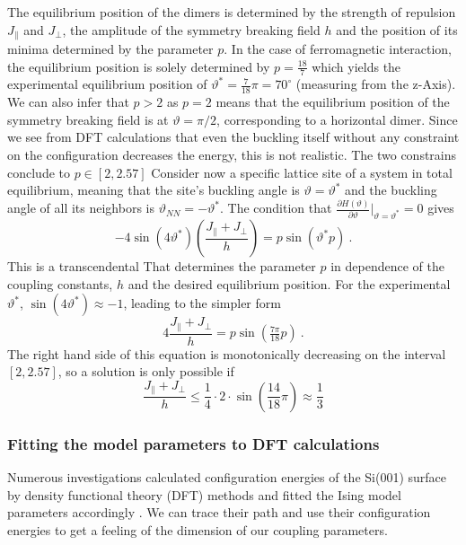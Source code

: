 	The equilibrium position of the dimers is determined by the strength of repulsion $J_\parallel$ and $J_\perp$, the amplitude of the symmetry breaking field $h$ and the position of its minima determined by the parameter $p$. In the case of ferromagnetic interaction, the equilibrium position is solely determined by $p = \tfrac{18}{7} $ which yields the experimental equilibrium position of $\vartheta^* =	\tfrac{7}{18} \pi = 70^\circ$ (measuring from the z-Axis). We can also infer that $p > 2$ as $p=2$ means that the equilibrium position of the symmetry breaking field is at $\vartheta = \pi /	2$, corresponding to a horizontal dimer. Since we see from DFT calculations that even the buckling itself without any constraint on the configuration decreases the energy, this is not realistic. The two constrains conclude to $p \in \left[2, 2.57\right]$ Consider now a specific lattice site of a system in total equilibrium, meaning that the site's buckling angle is $\vartheta =	\vartheta^*$ and the buckling angle of all its neighbors is $\vartheta_{NN} =	- \vartheta^*$. The condition that $\tfrac{\partial H(\vartheta)}{\partial \vartheta} \Big |_{\vartheta =	\vartheta^*} =	0$ gives
	\begin{equation} \label{Eq::Equilibrium-Position}
		-4 \sin(4 \vartheta^*) \left(\frac{J_\parallel + J_\perp}{h}\right) =	p \sin \left(\vartheta^* p\right)~.
	\end{equation}
	This is a transcendental That determines the parameter $p$ in dependence of the coupling constants, $h$ and the desired equilibrium position.
	For the experimental $\vartheta^*$, $\sin(4 \vartheta^*) \approx -1$, leading to the simpler form
	\begin{equation}
		4 \frac{J_\parallel + J_\perp}{h} =	p \sin(\tfrac{7\pi}{18} p)~.
	\end{equation}
	The right hand side of this equation is monotonically decreasing on the interval $\left[2, 2.57\right]$, so a solution is only possible if
	\begin{equation}
		\frac{J_\parallel + J_\perp}{h} \leq \frac{1}{4} \cdot 2 \cdot \sin (\frac{14}{18} \pi)  \approx \frac{1}{3}
	\end{equation}
	\subsubsection{Fitting the model parameters to DFT calculations}
	Numerous investigations calculated configuration energies of the Si(001) \cite{fu2001molecular, ramstad1995theoretical} surface by density functional theory (DFT) methods and fitted the Ising model parameters accordingly \cite{pillay2004revisit, inoue1994order, ihm1983structural, xiao2019spontaneous}. We can trace their path and use their configuration energies to get a feeling of the dimension of our coupling parameters.  \\
	
